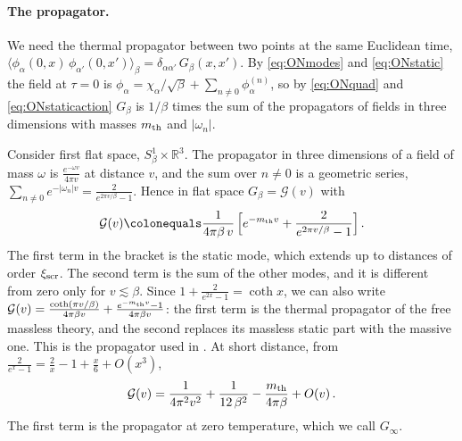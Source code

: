 \documentclass[a4paper,11pt]{article}
\newcommand{\xiscr}{\xi_{\rm scr}}
\begin{document}
\paragraph{The propagator.}
We need the thermal propagator between two points at the same Euclidean time, $\langle\phi_\alpha(0,x)\,\phi_{\alpha'}(0,x')\rangle_\beta=\delta_{\alpha\alpha'}\,G_\beta(x,x')$. By \eqref{eq:ONmodes} and \eqref{eq:ONstatic} the field at $\tau=0$ is $\phi_\alpha=\chi_\alpha/\sqrt\beta+\sum_{n\neq0}\phi^{(n)}_\alpha$, so by \eqref{eq:ONquad} and \eqref{eq:ONstaticaction} $G_\beta$ is $1/\beta$ times the sum of the propagators of fields in three dimensions with masses $m_{\rm th}$ and $|\omega_n|$.

Consider first flat space, $S^1_\beta\times\mathbb{R}^3$. The propagator in three dimensions of a field of mass $\omega$ is $\tfrac{e^{-\omega v}}{4\pi v}$ at distance $v$, and the sum over $n\neq0$ is a geometric series, $\sum_{n\neq0}e^{-|\omega_n|v}=\tfrac{2}{e^{2\pi v/\beta}-1}$. Hence in flat space $G_\beta=\mathcal{G}(v)$ with
\begin{equation}\label{eq:ONGflat}
	\mathcal{G}(v)\colonequals\frac{1}{4\pi\beta\,v}\,\Bigl[e^{-m_{\rm th}v}+\frac{2}{e^{2\pi v/\beta}-1}\Bigr]\, .
\end{equation}
The first term in the bracket is the static mode, which extends up to distances of order $\xiscr$. The second term is the sum of the other modes, and it is different from zero only for $v\lesssim\beta$. Since $1+\tfrac{2}{e^{2x}-1}=\coth x$, we can also write $\mathcal{G}(v)=\tfrac{\coth(\pi v/\beta)}{4\pi\beta v}+\tfrac{e^{-m_{\rm th}v}-1}{4\pi\beta v}$: the first term is the thermal propagator of the free massless theory, and the second replaces its massless static part with the massive one. This is the propagator used in \cite{BMP}. At short distance, from $\tfrac{2}{e^x-1}=\tfrac2x-1+\tfrac x6+O(x^3)$,
\begin{equation}\label{eq:ONGshort}
	\mathcal{G}(v)=\frac{1}{4\pi^2v^2}+\frac{1}{12\,\beta^2}-\frac{m_{\rm th}}{4\pi\beta}+O(v)\, .
\end{equation}
The first term is the propagator at zero temperature, which we call $G_\infty$.
\end{document}

